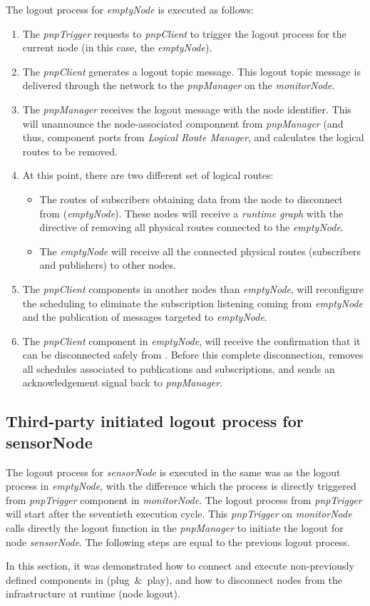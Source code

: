 The logout process for \emph{emptyNode} is executed as follows:
\begin{enumerate}
	\item The \emph{pnpTrigger} requests to \emph{pnpClient} to trigger the logout process for the current node (in this case, the \emph{emptyNode}).
	\item The \emph{pnpClient} generates a logout topic message. This logout topic message is delivered through the network to the \emph{pnpManager} on the \emph{monitorNode}.
	\item The \emph{pnpManager} receives the logout message with the node identifier. This will unannounce the node-associated componnent from \emph{pnpManager} (and thus, component ports from \emph{Logical Route Manager}, and calculates the logical routes to be removed. 
	\item At this point, there are two different set of logical routes:
	\begin{itemize}
		\item The routes of subscribers obtaining data from the node to disconnect from \xme (\emph{emptyNode}). These nodes will receive a \emph{runtime graph} with the directive of removing all physical routes connected to the \emph{emptyNode}.
	  \item The \emph{emptyNode} will receive all the connected physical routes (subscribers and publishers) to other nodes. 
	\end{itemize}
	\item The \emph{pnpClient} components in another nodes than \emph{emptyNode}, will reconfigure the scheduling to eliminate the subscription listening coming from \emph{emptyNode} and the publication of messages targeted to \emph{emptyNode}.
	\item The \emph{pnpClient} component in \emph{emptyNode}, will receive the confirmation that it can be disconnected safely from \xme. Before this complete disconnection, removes all schedules associated to publications and subscriptions, and sends an acknowledgement signal back to \emph{pnpManager}.
\end{enumerate}
		
\subsection{Third-party initiated logout process for sensorNode}

The logout process for \emph{sensorNode} is executed in the same was as the logout process in \emph{emptyNode}, with the difference which the process is directly triggered from \emph{pnpTrigger} component in \emph{monitorNode}. The logout process from \emph{pnpTrigger} will start after the seventieth execution cycle. This \emph{pnpTrigger} on \emph{monitorNode} calls directly the logout function in the \emph{pnpManager} to initiate the logout for node \emph{sensorNode}. The following steps are equal to the previous logout process. 

In this section, it was demonstrated how to connect and execute non-previously defined components in \xme (plug~\&~play), and how to disconnect nodes from the infrastructure at runtime (node logout). 